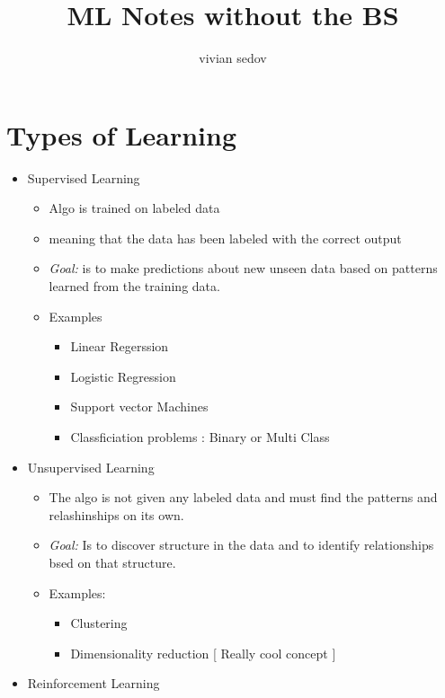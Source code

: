 \documentclass{article}
\title{ML Notes without the BS}
\author{vivian sedov}
\theoremstyle{mytheoremstyle}
\theoremstyle{mytheoremstyle}
\theoremstyle{myproblemstyle}
\begin{document}
\maketitle
\tableofcontents
\newpage

\section{Types of Learning}
\begin{itemize}
	\item Supervised Learning
	      \begin{itemize}
		      \item Algo is trained on labeled data
		      \item meaning that the data has been labeled with the correct output
		      \item \textit{Goal: } is to make predictions about new unseen data based on patterns learned from the training data.
		      \item Examples
		            \begin{itemize}
			            \item Linear Regerssion
			            \item Logistic Regression
			            \item Support vector Machines
			            \item Classficiation problems : Binary or Multi Class
		            \end{itemize}
	      \end{itemize}
	\item Unsupervised Learning
	      \begin{itemize}
		      \item The algo is not given any labeled data and must find the patterns and relashinships on its own.
		      \item \textit{Goal: } Is to discover structure in the data and to identify relationships bsed on that structure.
		      \item Examples:
		            \begin{itemize}
			            \item Clustering
			            \item Dimensionality reduction [ Really cool concept ]
		            \end{itemize}
	      \end{itemize}
	\item Reinforcement Learning
	      \begin{itemize}

\end{itemize}
\end{itemize}
\end{document}
